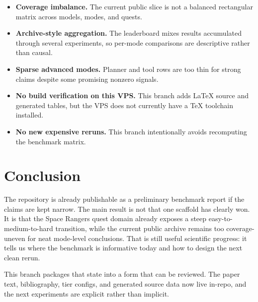 \documentclass[11pt]{article}
\begin{document}
\begin{itemize}[leftmargin=1.5em]
  \item \textbf{Coverage imbalance.} The current public slice is not a balanced rectangular matrix across models, modes, and quests.
  \item \textbf{Archive-style aggregation.} The leaderboard mixes results accumulated through several experiments, so per-mode comparisons are descriptive rather than causal.
  \item \textbf{Sparse advanced modes.} Planner and tool rows are too thin for strong claims despite some promising nonzero signals.
  \item \textbf{No build verification on this VPS.} This branch adds LaTeX source and generated tables, but the VPS does not currently have a TeX toolchain installed.
  \item \textbf{No new expensive reruns.} This branch intentionally avoids recomputing the benchmark matrix.
\end{itemize}

\section{Conclusion}

The repository is already publishable as a preliminary benchmark report if the claims are kept narrow. The main result is not that one scaffold has clearly won. It is that the Space Rangers quest domain already exposes a steep easy-to-medium-to-hard transition, while the current public archive remains too coverage-uneven for neat mode-level conclusions. That is still useful scientific progress: it tells us where the benchmark is informative today and how to design the next clean rerun.

This branch packages that state into a form that can be reviewed. The paper text, bibliography, tier configs, and generated source data now live in-repo, and the next experiments are explicit rather than implicit.



\end{document}
